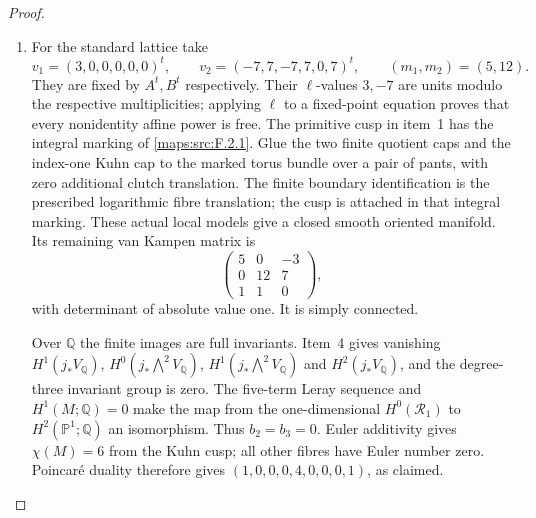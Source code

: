 \begin{proof}
\begin{enumerate}[label=\arabic*.]
\item For the standard lattice take
\[
 v_1=(3,0,0,0,0,0)^t,\qquad
 v_2=(-7,7,-7,7,0,7)^t,\qquad (m_1,m_2)=(5,12).
\]
They are fixed by $A^t,B^t$ respectively.
Their $\ell$-values $3,-7$ are units modulo the respective
multiplicities; applying $\ell$ to a fixed-point equation proves
that every nonidentity affine power is free.
The primitive cusp in item~1 has the integral marking of
\cref{maps:src:F.2.1}.  Glue the two finite quotient caps and
the index-one Kuhn cap to the marked torus bundle over a pair
of pants, with zero additional clutch translation.  The finite
boundary identification is the prescribed logarithmic fibre
translation; the cusp is attached in that integral marking.
These actual local models give a closed smooth oriented
manifold.  Its remaining van Kampen matrix is
\[
 \begin{pmatrix}5&0&-3\\0&12&7\\1&1&0\end{pmatrix},
\]
with determinant of absolute value one.  It is simply connected.

Over $\mathbb Q$ the finite images are full invariants.
Item~4 gives vanishing $H^1(j_*V_{\mathbb Q})$,
$H^0(j_*\bigwedge^2V_{\mathbb Q})$,
$H^1(j_*\bigwedge^2V_{\mathbb Q})$ and
$H^2(j_*V_{\mathbb Q})$, and the degree-three invariant group
is zero.  The five-term Leray sequence and $H^1(M;\mathbb Q)=0$
make the map from the one-dimensional $H^0(\mathcal R_1)$ to
$H^2(\mathbb P^1;\mathbb Q)$ an isomorphism.
Thus $b_2=b_3=0$.
Euler additivity gives $\chi(M)=6$ from the Kuhn cusp;
all other fibres have Euler number zero.
Poincar\'e duality therefore gives
$(1,0,0,0,4,0,0,0,1)$, as claimed.
\end{enumerate}
\end{proof}




